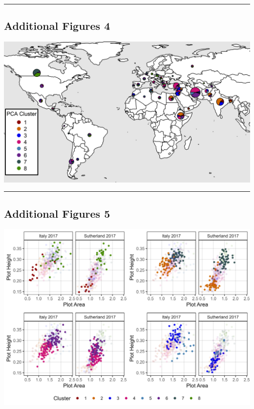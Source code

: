 \documentclass[
]{article}
\begin{document}
\begin{center}\rule{0.5\linewidth}{0.5pt}\end{center}

\subsection{Additional Figures 4}\label{additional-figures-4}

\includegraphics{Additional/Additional_Figure_04.png}

\begin{center}\rule{0.5\linewidth}{0.5pt}\end{center}

\subsection{Additional Figures 5}\label{additional-figures-5}

\includegraphics{Additional/Additional_Figure_05.png}
\end{document}
